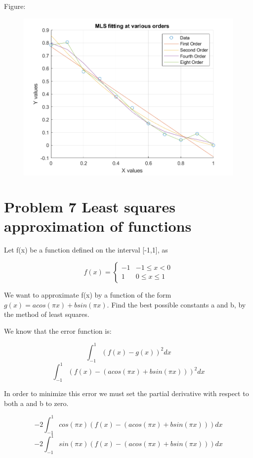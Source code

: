 \documentclass[]{article}
\begin{document}
Figure:

\begin{figure}
\centering
\includegraphics{./Problem6Figure.png}
\caption{}
\end{figure}

\section{Problem 7 Least squares approximation of
functions}\label{problem-7-least-squares-approximation-of-functions}

Let f(x) be a function defined on the interval {[}-1,1{]}, as

\[
f(x) = \begin{cases} 
    -1 & -1 \leq x < 0 \\
    1 & 0 \leq x\leq 1 
\end{cases}
\]

We want to approximate f(x) by a function of the form
\(g(x) = acos(\pi x) + bsin(\pi x)\). Find the best possible constants a
and b, by the method of least squares.

We know that the error function is:

\[
\int_{-1}^{1} (f(x)-g(x))^2dx
\] \[
\int_{-1}^{1} (f(x)-(acos(\pi x)+bsin(\pi x)))^2dx
\]

In order to minimize this error we must set the partial derivative with
respect to both a and b to zero.

\[
-2\int_{-1}^{1} cos(\pi x)(f(x)-(acos(\pi x)+bsin(\pi x)))dx
\] \[
-2\int_{-1}^{1} sin(\pi x)(f(x)-(acos(\pi x)+bsin(\pi x)))dx
\]
\end{document}
